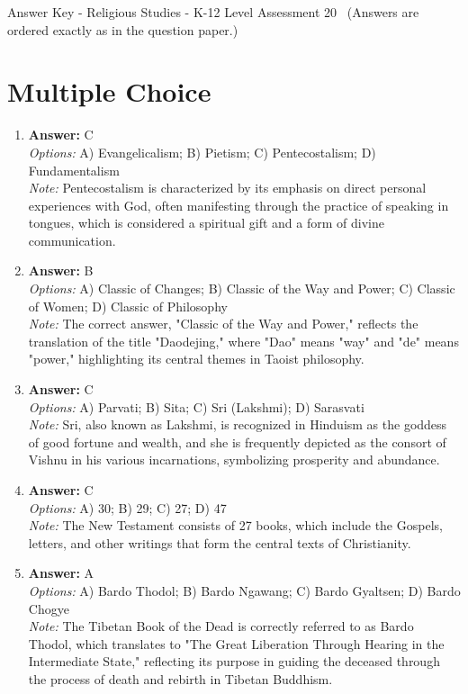 \documentclass[12pt]{article}
\begin{document}
\begin{center}
Answer Key - Religious Studies - K-12 Level Assessment 20 \
\small (Answers are ordered exactly as in the question paper.)
\end{center}

\section*{Multiple Choice}
\begin{enumerate}[label=\arabic*.]
\item \textbf{Answer:} C
\\ \textit{Options:} A) Evangelicalism; B) Pietism; C) Pentecostalism; D) Fundamentalism
\\ \textit{Note:} Pentecostalism is characterized by its emphasis on direct personal experiences with God, often manifesting through the practice of speaking in tongues, which is considered a spiritual gift and a form of divine communication.
\item \textbf{Answer:} B
\\ \textit{Options:} A) Classic of Changes; B) Classic of the Way and Power; C) Classic of Women; D) Classic of Philosophy
\\ \textit{Note:} The correct answer, "Classic of the Way and Power," reflects the translation of the title "Daodejing," where "Dao" means "way" and "de" means "power," highlighting its central themes in Taoist philosophy.
\item \textbf{Answer:} C
\\ \textit{Options:} A) Parvati; B) Sita; C) Sri (Lakshmi); D) Sarasvati
\\ \textit{Note:} Sri, also known as Lakshmi, is recognized in Hinduism as the goddess of good fortune and wealth, and she is frequently depicted as the consort of Vishnu in his various incarnations, symbolizing prosperity and abundance.
\item \textbf{Answer:} C
\\ \textit{Options:} A) 30; B) 29; C) 27; D) 47
\\ \textit{Note:} The New Testament consists of 27 books, which include the Gospels, letters, and other writings that form the central texts of Christianity.
\item \textbf{Answer:} A
\\ \textit{Options:} A) Bardo Thodol; B) Bardo Ngawang; C) Bardo Gyaltsen; D) Bardo Chogye
\\ \textit{Note:} The Tibetan Book of the Dead is correctly referred to as Bardo Thodol, which translates to "The Great Liberation Through Hearing in the Intermediate State," reflecting its purpose in guiding the deceased through the process of death and rebirth in Tibetan Buddhism.
\end{enumerate}
\end{document}
